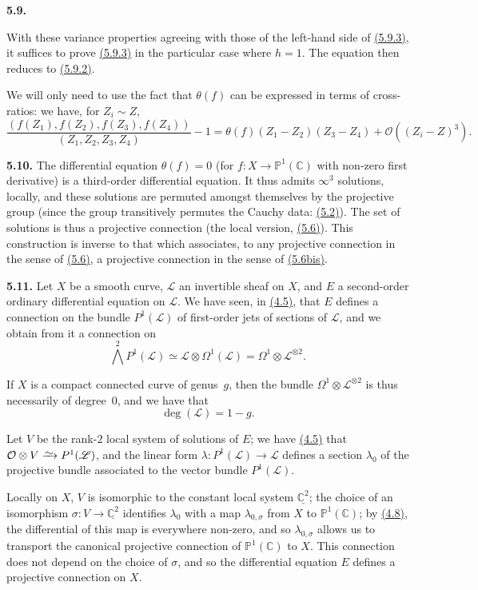 \documentclass{report}
\newenvironment{rmenv}[1]
  {\phantomsection\par\medskip\noindent\textbf{#1.}\rmfamily}
  {\par\medskip}
\newcommand{\scr}[1]{{\mathscr{#1}}}
\renewcommand{\cal}[1]{{\mathcal{#1}}}
\newcommand{\PP}{\mathbb{P}}
\newcommand{\CC}{\mathbb{C}}
\newcommand{\simto}{\xrightarrow{\raisebox{-0.7ex}[0ex][0ex]{$\sim$}}}
\newcommand{\oldpage}[1]{\marginpar{\footnotesize$\Big\vert$ \textit{p.~#1}}}
\begin{document}
\begin{rmenv}{5.9}
\begin{enumerate}[(i)]
      With these variance properties agreeing with those of the left-hand side of \hyperref[I.5.9.3]{(5.9.3)}, it suffices to prove \hyperref[I.5.9.3]{(5.9.3)} in the particular case where $h=1$.
      The equation then reduces to \hyperref[I.5.9.2]{(5.9.2)}.
  \end{enumerate}

  We will only need to use the fact that $\theta(f)$ can be expressed in terms of cross-ratios:
  we have, for $Z_i\sim Z$,
  \[
  \label{I.5.9.4}
    \frac{(f(Z_1),f(Z_2),f(Z_3),f(Z_4))}{(Z_1,Z_2,Z_3,Z_4)} - 1
    = \theta(f)(Z_1-Z_2)(Z_3-Z_4) + \mathcal{O}((Z_i-Z)^3).
  \tag{5.9.4}
  \]
\end{rmenv}

\oldpage{35}
\begin{rmenv}{5.10}
\label{I.5.10}
  The differential equation $\theta(f)=0$ (for $f\colon X\to\PP^1(\CC)$ with non-zero first derivative) is a third-order differential equation.
  It thus admits $\infty^3$ solutions, locally, and these solutions are permuted amongst themselves by the projective group (since the group transitively permutes the Cauchy data: \hyperref[I.5.2]{(5.2)}).
  The set of solutions is thus a projective connection (the local version, \hyperref[I.5.6]{(5.6)}).
  This construction is inverse to that which associates, to any projective connection in the sense of \hyperref[I.5.6]{(5.6)}, a projective connection in the sense of \hyperref[I.5.6bis]{(5.6bis)}.
\end{rmenv}

\begin{rmenv}{5.11}
\label{I.5.11}
  Let $X$ be a smooth curve, $\scr{L}$ an invertible sheaf on $X$, and $E$ a second-order ordinary differential equation on $\scr{L}$.
  We have seen, in \hyperref[I.4.5]{(4.5)}, that $E$ defines a connection on the bundle $P^1(\scr{L})$ of first-order jets of sections of $\scr{L}$, and we obtain from it a connection on
  \[
    \bigwedge^2 P^1(\scr{L}) \simeq \scr{L}\otimes\Omega^1(\scr{L}) = \Omega^1\otimes\scr{L}^{\otimes2}.
  \]

  If $X$ is a compact connected curve of genus~$g$, then the bundle $\Omega^1\otimes\scr{L}^{\otimes2}$ is thus necessarily of degree~$0$, and we have that
  \[
    \deg(\scr{L}) = 1-g.
  \]

  Let $V$ be the rank-$2$ local system of solutions of $E$;
  we have \hyperref[I.4.5]{(4.5)} that $\cal{O}\otimes V\simto P^1(\scr{L})$, and the linear form $\lambda\colon P^1(\scr{L})\to\scr{L}$ defines a section $\lambda_0$ of the projective bundle associated to the vector bundle $P^1(\scr{L})$.

  Locally on $X$, $V$ is isomorphic to the constant local system $\underline{\CC^2}$;
  the choice of an isomorphism $\sigma\colon V\to\underline{\CC^2}$ identifies $\lambda_0$ with a map $\lambda_{0,\sigma}$ from $X$ to $\PP^1(\CC)$;
  by \hyperref[I.4.8]{(4.8)}, the differential of this map is everywhere non-zero, and so $\lambda_{0,\sigma}$ allows us to transport the canonical projective connection of $\PP^1(\CC)$ to $X$.
  This connection does not depend on the choice of $\sigma$, and so the differential equation $E$ defines a projective connection on $X$.
\end{rmenv}
\end{document}

